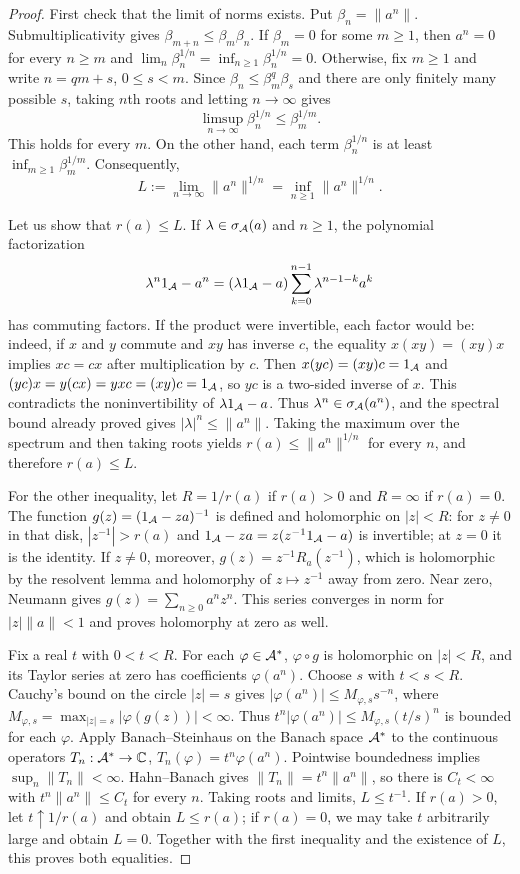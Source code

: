 \begin{proof}[Proof]
First check that the limit of norms exists. Put
$\beta_n=\|a^n\|$. Submultiplicativity gives
$\beta_{m+n}\le\beta_m\beta_n$. If $\beta_m=0$ for some
$m\ge1$, then $a^n=0$ for every $n\ge m$ and
$\lim_n\beta_n^{1/n}=\inf_{n\ge1}\beta_n^{1/n}=0$.
Otherwise, fix $m\ge1$ and write $n=qm+s$,
$0\le s<m$. Since
$\beta_n\le\beta_m^q\beta_s$ and there are only finitely many
possible $s$, taking $n$th roots and letting $n\to\infty$
gives
\[
 \limsup_{n\to\infty}\beta_n^{1/n}\le\beta_m^{1/m}.
\]
This holds for every $m$. On the other hand, each term
$\beta_n^{1/n}$ is at least $\inf_{m\ge1}\beta_m^{1/m}$.
Consequently,
\[
 L:=\lim_{n\to\infty}\|a^n\|^{1/n}
   =\inf_{n\ge1}\|a^n\|^{1/n}.
\]

Let us show that $r(a)\le L$. If $\lambda\in\sigma_\mathcal A(a)$ and
$n\ge1$, the polynomial factorization
\[
 \lambda^n1_\mathcal A-a^n
 =(\lambda1_\mathcal A-a)
   \sum_{k=0}^{n-1}\lambda^{n-1-k}a^k
 \]
has commuting factors. If the product were invertible, each
factor would be: indeed, if $x$ and $y$ commute and $xy$ has
inverse $c$, the equality $x(xy)=(xy)x$ implies $xc=cx$ after
multiplication by $c$. Then
$x(yc)=(xy)c=1_\mathcal A$ and
$(yc)x=y(cx)=yx c=(xy)c=1_\mathcal A$, so $yc$ is
a two-sided inverse of $x$.
This contradicts the noninvertibility of $\lambda1_\mathcal A-a$. Thus
$\lambda^n\in\sigma_\mathcal A(a^n)$, and the spectral bound already proved gives
$|\lambda|^n\le\|a^n\|$. Taking the maximum over the spectrum
and then taking roots yields $r(a)\le\|a^n\|^{1/n}$ for every
$n$, and therefore $r(a)\le L$.

For the other inequality, let $R=1/r(a)$ if $r(a)>0$ and
$R=\infty$ if $r(a)=0$. The function
$g(z)=(1_\mathcal A-za)^{-1}$ is defined and holomorphic on
$|z|<R$: for $z\ne0$ in that disk,
$|z^{-1}|>r(a)$ and
$1_\mathcal A-za=z(z^{-1}1_\mathcal A-a)$ is invertible; at $z=0$
it is the identity. If $z\ne0$, moreover,
$g(z)=z^{-1}R_a(z^{-1})$, which is holomorphic by the resolvent
lemma and holomorphy of $z\mapsto z^{-1}$ away from zero.
Near zero, Neumann gives
$g(z)=\sum_{n\ge0}a^nz^n$.
This series converges in norm for $|z|\|a\|<1$ and proves
holomorphy at zero as well.

Fix a real $t$ with $0<t<R$. For each $\varphi\in\mathcal A^*$,
$\varphi\circ g$ is holomorphic on $|z|<R$, and its Taylor series
at zero has coefficients $\varphi(a^n)$. Choose $s$ with
$t<s<R$. Cauchy's bound on the circle $|z|=s$ gives
$|\varphi(a^n)|\le M_{\varphi,s}s^{-n}$, where
$M_{\varphi,s}=\max_{|z|=s}|\varphi(g(z))|<\infty$.
Thus $t^n|\varphi(a^n)|\le M_{\varphi,s}(t/s)^n$ is
bounded for each $\varphi$. Apply Banach--Steinhaus on the Banach space
$\mathcal A^*$ to the continuous operators
$T_n:\mathcal A^*\to\mathbb C$,
$T_n(\varphi)=t^n\varphi(a^n)$. Pointwise boundedness implies
$\sup_n\|T_n\|<\infty$. Hahn--Banach gives
$\|T_n\|=t^n\|a^n\|$, so there is $C_t<\infty$ with
$t^n\|a^n\|\le C_t$ for every $n$. Taking roots and limits,
$L\le t^{-1}$. If $r(a)>0$, let $t\uparrow1/r(a)$ and
obtain $L\le r(a)$; if $r(a)=0$, we may take $t$
arbitrarily large and obtain $L=0$. Together with the first
inequality and the existence of $L$, this proves both equalities.
\end{proof}

